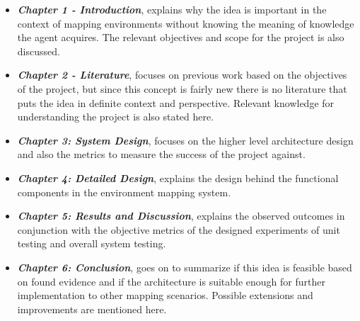 \begin{itemize}
	\item \textbf{\textit{Chapter 1 - Introduction}}, explains why the idea is important in the context of mapping environments without knowing the meaning of knowledge the agent acquires. The relevant objectives and scope for the project is also discussed. 
	\item \textbf{\textit{Chapter 2 -  Literature}}, focuses on previous work based on the objectives of the project, but since this concept is fairly new there is no literature that puts the idea in definite context and perspective. Relevant knowledge for understanding the project is also stated here.
	
	\item \textbf{\textit{Chapter 3: System Design}}, focuses on the higher level architecture design and also the metrics to measure the success of the project against.
	
	\item \textbf{\textit{Chapter 4: Detailed Design}}, explains the design behind the functional components in the environment mapping system.
	
	\item \textbf{\textit{Chapter 5: Results and Discussion}}, explains the observed outcomes in conjunction with the objective metrics of the designed experiments of unit testing and overall system testing.
	
	\item \textbf{\textit{Chapter 6: Conclusion}}, goes on to summarize if this idea is feasible based on found evidence and if the architecture is suitable enough for further implementation to other mapping scenarios. Possible extensions and improvements are mentioned here.
	
\end{itemize}






